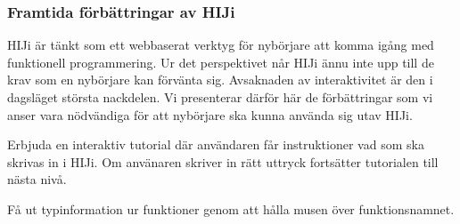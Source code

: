 \subsubsection{Framtida förbättringar av HIJi}
HIJi är tänkt som ett webbaserat verktyg för nybörjare att komma igång med funktionell programmering. Ur det perspektivet når HIJi ännu inte upp till de krav som en nybörjare kan förvänta sig. Avsaknaden av interaktivitet är den i dagsläget största nackdelen. Vi presenterar därför här de förbättringar som vi anser vara nödvändiga för att nybörjare ska kunna använda sig utav HIJi.

Erbjuda en interaktiv tutorial där användaren får instruktioner vad som ska skrivas in i HIJi. Om använaren skriver in rätt uttryck fortsätter tutorialen till nästa nivå.

Få ut typinformation ur funktioner genom att hålla musen över funktionsnamnet. 
